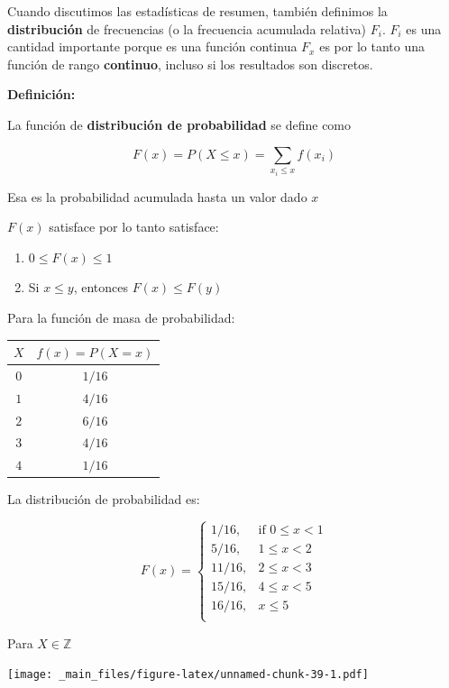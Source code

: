 \documentclass[
]{book}
\providecommand{\tightlist}{%
  \setlength{\itemsep}{0pt}\setlength{\parskip}{0pt}}
\begin{document}
Cuando discutimos las estadísticas de resumen, también definimos la \textbf{distribución} de frecuencias (o la frecuencia acumulada relativa) \(F_i\). \(F_i\) es una cantidad importante porque es una función continua \(F_x\) es por lo tanto una función de rango \textbf{continuo}, incluso si los resultados son discretos.

\textbf{Definición:}

La función de \textbf{distribución de probabilidad} se define como

\[F(x)=P(X\leq x)=\sum_{x_i\leq x} f(x_i) \]

Esa es la probabilidad acumulada hasta un valor dado \(x\)

\(F(x)\) satisface por lo tanto satisface:

\begin{enumerate}
\def\labelenumi{\arabic{enumi})}
\tightlist
\item
  \(0\leq F(x) \leq 1\)
\item
  Si \(x \leq y\), entonces \(F(x) \leq F(y)\)
\end{enumerate}

Para la función de masa de probabilidad:

\begin{longtable}[]{@{}cc@{}}
\toprule\noalign{}
\(X\) & \(f(x)=P(X=x)\) \\
\midrule\noalign{}
\endhead
\bottomrule\noalign{}
\endlastfoot
\(0\) & \(1/16\) \\
\(1\) & \(4/16\) \\
\(2\) & \(6/16\) \\
\(3\) & \(4/16\) \\
\(4\) & \(1/16\) \\
\end{longtable}

La distribución de probabilidad es:

\[
    F(x)=
\begin{cases}
    1/16,& \text{if } 0 \leq x < 1\\
    5/16,& 1\leq x < 2\\
    11/16,& 2\leq x < 3\\
    15/16,& 4\leq x < 5\\
    16/16,&  x \leq 5\\
\end{cases}
\]

Para \(X \in \mathbb{Z}\)

\texttt{[image: \_main\_files/figure-latex/unnamed-chunk-39-1.pdf]}
\end{document}

